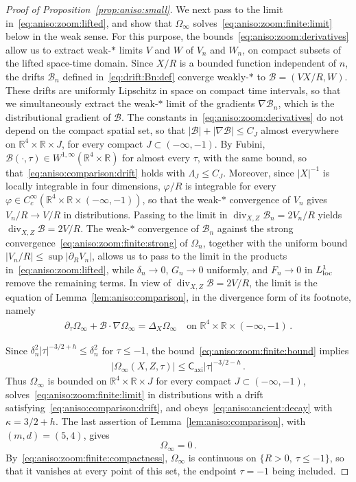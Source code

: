 \documentclass[11pt,reqno]{amsproc}
\numberwithin{equation}{section}
\theoremstyle{remark}
\newcommand{\p}{\partial}
\newcommand{\RR}{\mathbb R}
\renewcommand{\div}{\operatorname{div}}
\newcommand{\Caxi}{\mathsf{C}_{\mathrm{axi}}}
\begin{document}
\begin{proof}[Proof of Proposition~\ref{prop:aniso:small}]
We next pass to the limit in~\eqref{eq:aniso:zoom:lifted}, and show that $\Omega_\infty$ solves~\eqref{eq:aniso:zoom:finite:limit} below in the weak sense.
For this purpose, the bounds~\eqref{eq:aniso:zoom:derivatives} allow us to extract weak-$*$ limits $V$ and $W$ of $V_n$ and $W_n$, on compact subsets of the lifted space-time domain. Since $X/R$ is a bounded function independent of $n$, the drifts $\mathcal B_n$ defined in~\eqref{eq:drift:Bn:def} converge weakly-$*$ to $\mathcal B=(VX/R,W)$. These drifts are uniformly Lipschitz in space on compact time intervals, so that we simultaneously extract the weak-$*$ limit of the gradients $\nabla\mathcal B_n$, which is the distributional gradient of $\mathcal B$. The constants in~\eqref{eq:aniso:zoom:derivatives} do not depend on the compact spatial set, so that $|\mathcal B|+|\nabla\mathcal B|\le C_J$ almost everywhere on $\RR^4\times\RR\times J$, for every compact $J\subset(-\infty,-1)$. By Fubini, $\mathcal B(\cdot,\tau)\in W^{1,\infty}(\RR^4\times\RR)$ for almost every $\tau$, with the same bound, so that~\eqref{eq:aniso:comparison:drift} holds with $\Lambda_J\le C_J$. Moreover, since $|X|^{-1}$ is locally integrable in four dimensions, $\varphi/R$ is integrable for every $\varphi\in C^\infty_c(\RR^4\times\RR\times(-\infty,-1))$, so that the weak-$*$ convergence of $V_n$ gives $V_n/R\to V/R$ in distributions. Passing to the limit in $\div_{X,Z}\mathcal B_n=2V_n/R$ yields $\div_{X,Z}\mathcal B=2V/R$.
The weak-$*$ convergence of $\mathcal B_n$ against the strong convergence~\eqref{eq:aniso:zoom:finite:strong} of $\Omega_n$, together with the uniform bound $|V_n/R|\le\sup|\p_RV_n|$, allows us to pass to the limit in the products in~\eqref{eq:aniso:zoom:lifted}, while $\delta_n\to0$, $G_n\to0$ uniformly, and $F_n\to0$ in $L^1_{\rm loc}$ remove the remaining terms. In view of $\div_{X,Z}\mathcal B=2V/R$, the limit is the equation of Lemma~\ref{lem:aniso:comparison}, in the divergence form of its footnote, namely
\begin{align}
\label{eq:aniso:zoom:finite:limit}
\p_\tau \Omega_\infty+\mathcal B\cdot\nabla \Omega_\infty=\Delta_X\Omega_\infty
\quad\mbox{on }\RR^4\times\RR\times(-\infty,-1)
\,.
\end{align}

Since $\delta_n^2|\tau|^{-3/2+h}\le\delta_n^2$ for $\tau\le-1$, the bound~\eqref{eq:aniso:zoom:finite:bound} implies
\begin{align*}
|\Omega_\infty(X,Z,\tau)|\le \Caxi|\tau|^{-3/2-h}
\,.
\end{align*}
Thus $\Omega_\infty$ is bounded on $\RR^4\times\RR\times J$ for every compact $J\subset(-\infty,-1)$, solves~\eqref{eq:aniso:zoom:finite:limit} in distributions with a drift satisfying~\eqref{eq:aniso:comparison:drift}, and obeys~\eqref{eq:aniso:ancient:decay} with $\kappa=3/2+h$. The last assertion of Lemma~\ref{lem:aniso:comparison}, with $(m,d)=(5,4)$, gives
\[
\Omega_\infty=0 \,.
\]
By~\eqref{eq:aniso:zoom:finite:compactness}, $\Omega_\infty$ is continuous on $\{R>0,\ \tau\le-1\}$, so that it vanishes at every point of this set, the endpoint $\tau=-1$ being included.


\end{proof}
\end{document}

